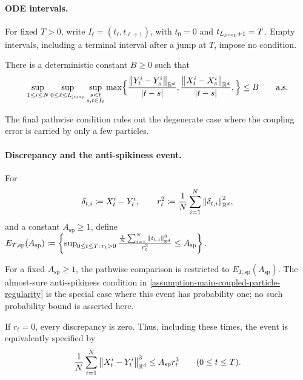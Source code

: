 \paragraph{ODE intervals.}
For fixed $T>0$, write $I_\ell=(t_\ell,t_{\ell+1})$, with $t_0=0$
and $t_{L_{\mathrm{jump}}+1}=T$. Empty intervals, including a terminal interval
after a jump at $T$, impose no condition.
\begin{assumption}
\label{assumption-uniform-concentration-piecewise-lipschitz}
There is a deterministic constant $B\ge0$ such that
\begin{equation}
\sup_{1\le i\le N}\sup_{0\le \ell\le L_{\mathrm{jump}}}\sup_{\substack{s<t\\ s,t\in I_\ell}}
\max\Bigl\{
    \frac{\norm{Y_t^i-Y_s^i}_{\mathbb R^d}}{|t-s|},
     \frac{\norm{X_t^i-X_s^i}_{\mathbb R^d}}{|t-s|},
\Bigr\}
\le
B
\qquad\text{a.s.}
\end{equation}
\end{assumption}

The final pathwise condition rules out the degenerate case where the coupling error is carried by only a few particles.

\paragraph{Discrepancy and the anti-spikiness event.}
For
\[
    \delta_{t,i}\coloneq X_t^i-Y_t^i,
    \qquad
    r_t^2\coloneq \frac1N\sum_{i=1}^N\norm{\delta_{t,i}}_{\mathbb R^d}^2,
\]
and a constant \(A_{\mathrm{sp}}\ge 1\), define $E_{T,\mathrm{sp}}(A_{\mathrm{sp}})
    \coloneq
    \left\{
    \sup_{0\le t\le T:\,r_t>0}
    \frac{\frac1N\sum_{i=1}^N\norm{\delta_{t,i}}_{\mathbb R^d}^3}{r_t^3}
    \le
    A_{\mathrm{sp}}
    \right\}.$

\begin{assumption}
\label{assumption-anti-spikiness-event}
For a fixed $A_{\mathrm{sp}}\ge1$, the pathwise comparison is restricted
to $E_{T,\mathrm{sp}}(A_{\mathrm{sp}})$. The almost-sure anti-spikiness
condition in \cref{assumption-main-coupled-particle-regularity} is the special case where this
event has probability one; no such probability bound is asserted here.
\end{assumption}
If $r_t=0$, every discrepancy is zero. Thus, including these times,
the event is equivalently specified by
\begin{equation}
\label{eq-cubic-antispike-bound}
    \frac1N\sum_{i=1}^N\norm{X_t^i-Y_t^i}_{\mathbb R^d}^3
    \le
    A_{\mathrm{sp}}r_t^3
    \qquad(0\le t\le T).
\end{equation}

